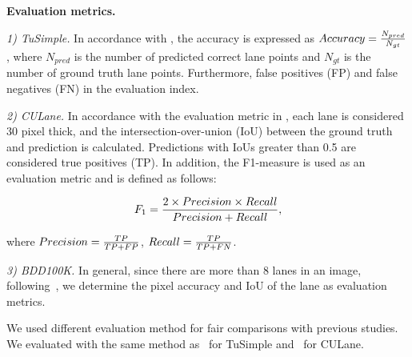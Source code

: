 \documentclass[10pt,twocolumn,letterpaper]{article}
\begin{document}
\noindent
\textbf{Evaluation metrics.} 

\noindent
\textit{1) TuSimple.} In accordance with \cite{tusimple}, the accuracy is expressed as $Accuracy={N_{pred}\over N_{gt}}$, where $N_{pred}$ is the number of predicted correct lane points and $N_{gt}$ is the number of ground truth lane points. Furthermore, false positives (FP) and false negatives (FN) in the evaluation index.

\noindent
\textit{2) CULane.} In accordance with the evaluation metric in \cite{pan2017spatial}, each lane is considered 30 pixel thick, and the intersection-over-union (IoU) between the ground truth and prediction is calculated. Predictions with IoUs greater than 0.5 are considered true positives (TP). In addition, the F1-measure is used as an evaluation metric and is defined as follows:

\begin{equation}
	F_1={{2\times Precision\times Recall} \over {Precision+Recall}},
	\label{eq:five}
\end{equation}

\noindent
where $P recision={{TP} \over {TP+FP}}$, $Recall={{TP} \over {TP+FN}}$.

\noindent
\textit{3) BDD100K.} In general, since there are more than 8 lanes in an image, following~\cite{hou2019learning}, we determine the pixel accuracy and IoU of the lane as evaluation metrics.

We used different evaluation method for fair comparisons with previous studies. We evaluated with the same method as~\cite{ghafoorian2018gan, hou2019learning, neven2018towards, pan2017spatial} for TuSimple and~\cite{hou2019learning, pan2017spatial, qin2020ultra, yoo2020end} for CULane.
\end{document}
